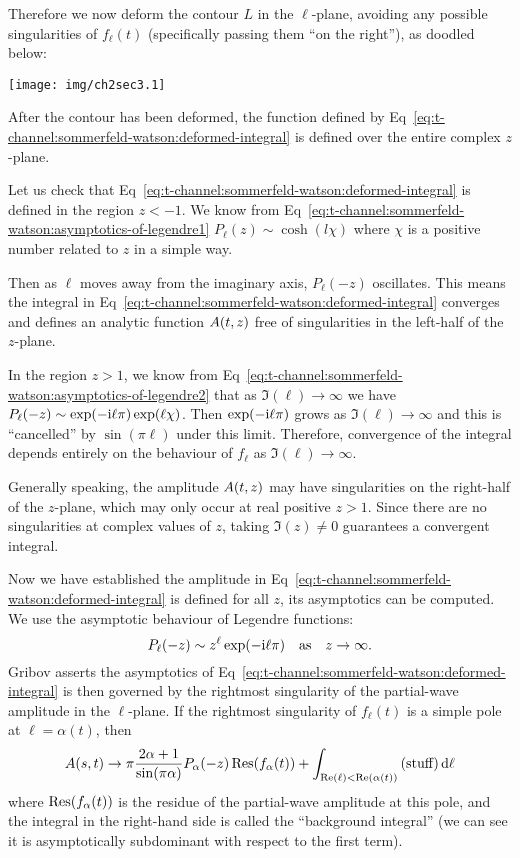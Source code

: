 Therefore we now deform the contour $L$ in the $\ell$-plane, avoiding
any possible singularities of $f_{\ell}(t)$ (specifically passing them
``on the right''), as doodled below:
\begin{center}
  \texttt{[image: img/ch2sec3.1]}
\end{center}
After the contour has been deformed, the function defined by Eq~\eqref{eq:t-channel:sommerfeld-watson:deformed-integral}
is defined over the entire complex $z$-plane.

Let us check that Eq~\eqref{eq:t-channel:sommerfeld-watson:deformed-integral}
is defined in the region $z<-1$. We know from Eq~\eqref{eq:t-channel:sommerfeld-watson:asymptotics-of-legendre1} $P_{\ell}(z)\sim\cosh(l\chi)$
where $\chi$ is a positive number related to $z$ in a simple way.

Then as $\ell$ moves away from the imaginary axis, $P_{\ell}(-z)$
oscillates. This means the integral in Eq~\eqref{eq:t-channel:sommerfeld-watson:deformed-integral}
converges and defines an analytic function $A(t,z)$ free of
singularities in the left-half of the $z$-plane.

In the region $z > 1$, we know from Eq~\eqref{eq:t-channel:sommerfeld-watson:asymptotics-of-legendre2}
that as $\Im(\ell)\to\infty$ we have $P_{\ell}(-z)\sim\exp(-\mathrm{i}\ell\pi)\exp(\ell\chi)$.
Then $\exp(-\mathrm{i}\ell\pi)$ grows as $\Im(\ell)\to\infty$ and this is
``cancelled'' by $\sin(\pi\ell)$ under this limit. Therefore,
convergence of the integral depends entirely on the behaviour of
$f_{\ell}$ as $\Im(\ell)\to\infty$. 

Generally speaking, the amplitude $A(t,z)$ may have
singularities on the right-half of the $z$-plane, which may only occur
at real positive $z>1$. Since there are no singularities at complex
values of $z$, taking $\Im(z)\neq0$ guarantees a convergent integral.

Now we have established the amplitude in Eq~\eqref{eq:t-channel:sommerfeld-watson:deformed-integral}
is defined for all $z$, its asymptotics can be computed. We use the
asymptotic behaviour of Legendre functions:
\begin{equation}
P_{\ell}(-z)\sim z^{\ell}\exp(-\mathrm{i}\ell\pi)\quad\mbox{as}\quad z\to\infty.
\end{equation}
Gribov asserts the asymptotics of Eq~\eqref{eq:t-channel:sommerfeld-watson:deformed-integral}
is then governed by the rightmost singularity of the partial-wave
amplitude in the $\ell$-plane. If the rightmost singularity of
$f_{\ell}(t)$ is a simple pole at $\ell=\alpha(t)$, then
\begin{equation}
A(s,t)\to\pi\frac{2\alpha+1}{\sin(\pi\alpha)}P_{\alpha}(-z)\operatorname{Res}(f_{\alpha}(t))+\int_{\operatorname{Re}(\ell)<\operatorname{Re}(\alpha(t))}\mbox{(stuff)}\,\mathrm{d}\ell
\end{equation}
where $\operatorname{Res}(f_{\alpha}(t))$ is the residue of the partial-wave amplitude
at this pole, and the integral in the right-hand side is called the ``background
integral'' (we can see it is asymptotically subdominant with respect to
the first term).

